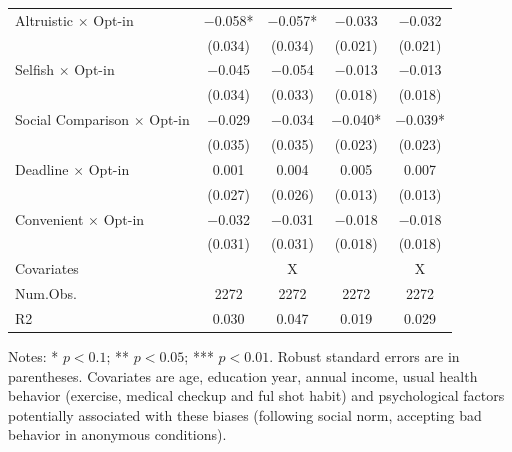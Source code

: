 \documentclass[
]{article}
\begin{document}
\begin{table}
\begin{threeparttable}
\begin{tabular}[t]{lcccc}
Altruistic $\times$ Opt-in & \num{-0.058}* & \num{-0.057}* & \num{-0.033} & \num{-0.032}\\
 & (\num{0.034}) & (\num{0.034}) & (\num{0.021}) & (\num{0.021})\\
Selfish $\times$ Opt-in & \num{-0.045} & \num{-0.054} & \num{-0.013} & \num{-0.013}\\
 & (\num{0.034}) & (\num{0.033}) & (\num{0.018}) & (\num{0.018})\\
Social Comparison $\times$ Opt-in & \num{-0.029} & \num{-0.034} & \num{-0.040}* & \num{-0.039}*\\
 & (\num{0.035}) & (\num{0.035}) & (\num{0.023}) & (\num{0.023})\\
Deadline $\times$ Opt-in & \num{0.001} & \num{0.004} & \num{0.005} & \num{0.007}\\
 & (\num{0.027}) & (\num{0.026}) & (\num{0.013}) & (\num{0.013})\\
Convenient $\times$ Opt-in & \num{-0.032} & \num{-0.031} & \num{-0.018} & \num{-0.018}\\
 & (\num{0.031}) & (\num{0.031}) & (\num{0.018}) & (\num{0.018})\\
\midrule
Covariates &  & X &  & X\\
Num.Obs. & \num{2272} & \num{2272} & \num{2272} & \num{2272}\\
R2 & \num{0.030} & \num{0.047} & \num{0.019} & \num{0.029}\\
\bottomrule
\end{tabular}
\begin{tablenotes}
\item Notes: * $p < 0.1$; ** $p < 0.05$; *** $p < 0.01$. Robust standard errors are in parentheses. Covariates are age, education year, annual income, usual health behavior (exercise, medical checkup and ful shot habit) and psychological factors potentially associated with these biases (following social norm, accepting bad behavior in anonymous conditions).
\end{tablenotes}
\end{threeparttable}
\end{table}
\end{document}
